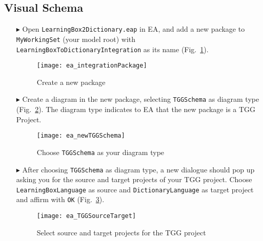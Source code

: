 \newpage
\hypertarget{schema vis}{}
\subsection{Visual Schema}
\visHeader

\begin{itemize}

\item[$\blacktriangleright$] Open \texttt{LearningBox2Dictionary.eap} in EA, and add a new package to \texttt{MyWorkingSet} (your model root) with
\texttt{Learning\-Box\-To\-Dictionary\-Integration} as its name (Fig.~\ref{fig:intgPackage}). 

\vspace{0.5cm}

\begin{figure}[htbp]
\begin{center}
  \texttt{[image: ea\_integrationPackage]}
  \caption{Create a new package}  
  \label{fig:intgPackage}
\end{center}
\end{figure}


\item[$\blacktriangleright$] Create a diagram in the new package, selecting \texttt{TGGSchema} as diagram type (Fig.~\ref{fig:tgg_diagram_type}). The diagram
type indicates to EA that the new package is a TGG Project.

\vspace{0.5cm}

\begin{figure}[htbp]
\begin{center}
  \texttt{[image: ea\_newTGGSchema]}
  \caption{Choose \texttt{TGGSchema} as your diagram type}  
  \label{fig:tgg_diagram_type}
\end{center}
\end{figure}

\item[$\blacktriangleright$] After choosing \texttt{TGGSchema} as diagram type, a new dialogue should pop up asking you for the source and target projects of your TGG project. 
Choose \texttt{Learning\-Box\-Language} as source and \texttt{Dictionary\-Language} as target project and affirm with \texttt{OK} (Fig.~\ref{fig:select_source_target}).

\vspace{0.5cm}

\begin{figure}[htbp]
\begin{center}
  \texttt{[image: ea\_TGGSourceTarget]}
  \caption{Select source and target projects for the TGG project}  
  \label{fig:select_source_target}
\end{center}
\end{figure}


\end{itemize}
